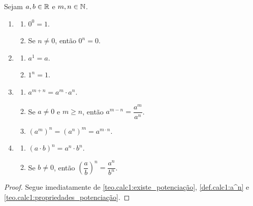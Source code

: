 \begin{corollary}
    Sejam $a,b \in \mathbb{R}$ e $m,n \in \mathbb{N}$.
        \begin{enumerate}[leftmargin=*, align=left, label=\textbf{(\alph*)}]
            \item 
                \begin{enumerate}[label=\roman*.]
                    \item $0^0 = 1$.
                    \item Se $n \neq 0$, então $0^n = 0$.
                \end{enumerate}
            \item 
                \begin{enumerate}[label=\roman*.]
                    \item $a^1 = a$.
                    \item $1^n = 1$.
                \end{enumerate}
            \item 
                \begin{enumerate}[label=\roman*.]
                    \item $a^{m+n} = a^m \cdot a^n$.
                    \item Se $a \neq 0$ e $m \geq n$, então $a^{m-n} = \dfrac{a^m}{a^n}$.
                    \item $(a^m)^n = (a^n)^m = a^{m \cdot n}$.
                \end{enumerate}
            \item 
                \begin{enumerate}[label=\roman*.]
                    \item $(a \cdot b)^n = a^n \cdot b^n$.
                    \item Se $b \neq 0$, então $\left( \dfrac{a}{b} \right)^n = \dfrac{a^n}{b^n}$.
                \end{enumerate}
        \end{enumerate}
\end{corollary}

\begin{proof}
    Segue imediatamente de \ref{teo.calc1:existe_potenciação}, \ref{def.calc1:a^n} e \ref{teo.calc1:propriedades_potenciação}. \blackproof
\end{proof}


